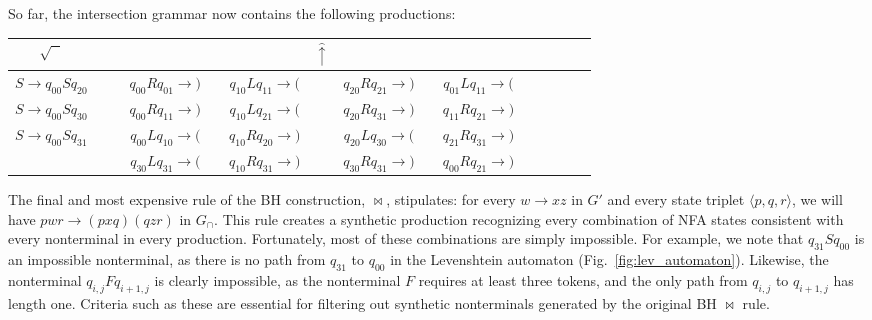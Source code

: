 \documentclass[runningheads]{llncs}
\begin{document}
So far, the intersection grammar now contains the following productions:\vspace{-5pt}

\begin{table}[H]
  \centering
  \begin{tabular}{cc|ccccccccccccc}
    $\sqrt{\phantom{S}}$ & & & & & & $\hat\uparrow$ & \\\hline
    $S \rightarrow q_{00}Sq_{20}$ & & & $q_{00}Rq_{01} \rightarrow \texttt{)}$ & & $q_{10}Lq_{11} \rightarrow \texttt{(}$ & & $q_{20}Rq_{21} \rightarrow \texttt{)}$ & & $q_{01}Lq_{11} \rightarrow \texttt{(}$ \\
    $S \rightarrow q_{00}Sq_{30}$ & & & $q_{00}Rq_{11} \rightarrow \texttt{)}$ & & $q_{10}Lq_{21} \rightarrow \texttt{(}$ & & $q_{20}Rq_{31} \rightarrow \texttt{)}$ & & $q_{11}Rq_{21} \rightarrow \texttt{)}$ \\
    $S \rightarrow q_{00}Sq_{31}$ & & & $q_{00}Lq_{10} \rightarrow \texttt{(}$ & & $q_{10}Rq_{20} \rightarrow \texttt{)}$ & & $q_{20}Lq_{30} \rightarrow \texttt{(}$ & & $q_{21}Rq_{31} \rightarrow \texttt{)}$ \\
                                  & & & $q_{30}Lq_{31} \rightarrow \texttt{(}$ & & $q_{10}Rq_{31} \rightarrow \texttt{)}$ & & $q_{30}Rq_{31} \rightarrow \texttt{)}$ & & $q_{00}Rq_{21} \rightarrow \texttt{)}$
  \end{tabular}
\end{table}\vspace{-8pt}

The final and most expensive rule of the BH construction, $\Join$, stipulates: for every $w \rightarrow xz$ in $G'$ and every state triplet $\langle p, q, r\rangle$, we will have $pwr \rightarrow (pxq)(qzr)$ in $G_\cap$. This rule creates a synthetic production recognizing every combination of NFA states consistent with every nonterminal in every production. Fortunately, most of these combinations are simply impossible. For example, we note that $q_{31}Sq_{00}$ is an impossible nonterminal, as there is no path from $q_{31}$ to $q_{00}$ in the Levenshtein automaton (Fig.~\ref{fig:lev_automaton}). Likewise, the nonterminal $q_{i, j}Fq_{i+1, j}$ is clearly impossible, as the nonterminal $F$ requires at least three tokens, and the only path from $q_{i, j}$ to $q_{i+1, j}$ has length one. Criteria such as these are essential for filtering out synthetic nonterminals generated by the original BH $\Join$ rule.
\end{document}
